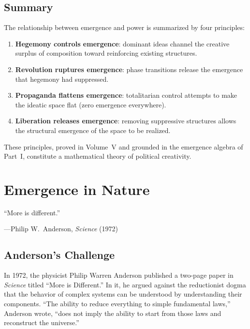 \section{Summary}

The relationship between emergence and power is summarized by four principles:

\begin{enumerate}
  \item \textbf{Hegemony controls emergence}: dominant ideas channel the creative
    surplus of composition toward reinforcing existing structures.
  \item \textbf{Revolution ruptures emergence}: phase transitions release the
    emergence that hegemony had suppressed.
  \item \textbf{Propaganda flattens emergence}: totalitarian control attempts to
    make the ideatic space flat (zero emergence everywhere).
  \item \textbf{Liberation releases emergence}: removing suppressive structures
    allows the structural emergence of the space to be realized.
\end{enumerate}

These principles, proved in Volume~V and grounded in the emergence algebra of
Part~I, constitute a mathematical theory of political creativity.



\chapter{Emergence in Nature}
\label{ch:emergence-nature}

\epigraph{``More is different.''}
{---Philip W.\ Anderson, \emph{Science} (1972)}


\section{Anderson's Challenge}

In 1972, the physicist Philip Warren Anderson published a two-page paper in
\emph{Science} titled ``More is Different.'' In it, he argued against the
reductionist dogma that the behavior of complex systems can be understood by
understanding their components. ``The ability to reduce everything to simple
fundamental laws,'' Anderson wrote, ``does not imply the ability to start from
those laws and reconstruct the universe.''

